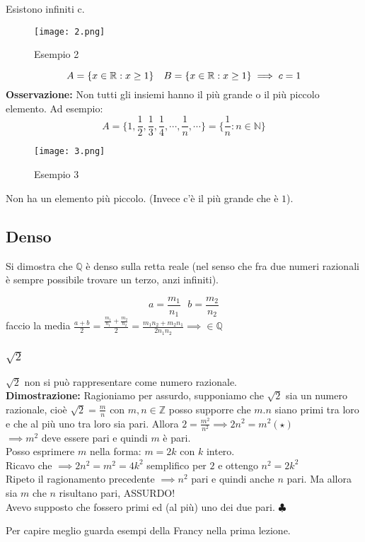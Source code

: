Esistono infiniti c.

\begin{figure}[!ht]
    \centering
    \texttt{[image: 2.png]}
    \caption{Esempio 2}
    \label{fig:2}
\end{figure}
\[
    A = \{x \in \mathbb{R} : x \geq 1\} \ \ \ B = \{x \in \mathbb{R} : x \geq 1\} \implies c = 1
\]
\textbf{Osservazione:} Non tutti gli insiemi hanno il più grande o il più piccolo elemento. Ad esempio:
\[
    A = \{1, \frac{1}{2}, \frac{1}{3}, \frac{1}{4}, \cdots, \frac{1}{n}, \cdots\} = \{\frac{1}{n} : n\in \mathbb{N}\}
\]
\begin{figure}[h]
    \centering
    \texttt{[image: 3.png]}
    \caption{Esempio 3}
    \label{fig:3}
\end{figure}

Non ha un elemento più piccolo. (Invece c'è il più grande che è $1$).

\subsection{Denso}
Si dimostra che $\mathbb{Q}$ è denso sulla retta reale (nel senso che fra due
numeri razionali è sempre possibile trovare un terzo, anzi infiniti).

\[
    a = \frac{m_1}{n_1} \ \ \ b = \frac{m_2}{n_2}
\]
faccio la media $\frac{a+b}{2} =\frac{\frac{m_1}{n_1} + \frac{m_2}{n_2}}{2} =
    \frac{m_1n_2 + m_2n_1}{2n_1n_2} \implies \in \mathbb{Q}$

\subsubsection{$\sqrt{2}$}
$\sqrt{2}$ non si può rappresentare come numero razionale.\\
\textbf{Dimostrazione:} Ragioniamo per assurdo, supponiamo che $\sqrt{2}$ sia un numero razionale, cioè $\sqrt{2} = \frac{m}{n}$ con $m,n \in \mathbb{Z}$ posso supporre che $m. n$ siano primi tra loro e che al più uno tra loro sia pari.
Allora $2 = \frac{m^2}{n^2} \implies  2n^2 = m^2 (\star)$\\
$\implies m^2$ deve essere pari e quindi $m$ è pari.\\
Posso esprimere $m$ nella forma: $m = 2k$ con $k$ intero.\\
Ricavo che $\implies 2n^2 = m^2 = 4k^2$ semplifico per $2$ e ottengo $n^2 = 2k^2$\\
Ripeto il ragionamento precedente $\implies n^2$ pari e quindi anche $n$ pari. Ma allora sia $m$ che $n$ risultano pari, ASSURDO!\\
Avevo supposto che fossero primi ed (al più) uno dei due pari. $\clubsuit$

Per capire meglio guarda esempi della Francy nella prima lezione.